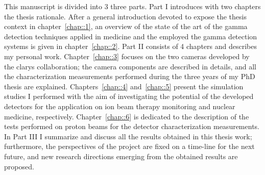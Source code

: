 This manuscript is divided into 3 three parts. Part I introduces with two chapters the thesis rationale. After a general introduction devoted to expose the thesis context in chapter~\ref{chap::1}, an overview of the state of the art of the gamma detection techniques applied in medicine and the employed the gamma detection systems is given in chapter~\ref{chap::2}. Part II consists of 4 chapters and describes my personal work. Chapter~\ref{chap::3} focuses on the two cameras developed by the \acrshort{clarys} collaboration; the camera components are described in details, and all the characterization measurements performed during the three years of my PhD thesis are explained. Chapters~\ref{chap::4} and~\ref{chap::5} present the simulation studies I performed with the aim of investigating the potential of the developed detectors for the application on ion beam therapy monitoring and nuclear medicine, respectively. Chapter~\ref{chap::6} is dedicated to the description of the tests performed on proton beams for the detector characterization measurements. In Part III I summarize and discuss all the results obtained in this thesis work; furthermore, the perspectives of the project are fixed on a time-line for the next future, and new research directions emerging from the obtained results are proposed.        